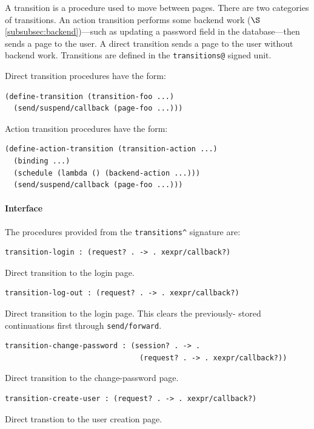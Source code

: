 \documentclass[a4paper]{article}
\begin{document}
A transition is a procedure used to move between pages. There are two categories
of transitions. An action transition performs some backend work
($\S$\ref{subsubsec:backend})---such as updating a password field in the
database---then sends a page to the user. A direct transition sends a page to
the user without backend work. Transitions are defined in the
\verb|transitions@| signed unit.

Direct transition procedures have the form:

\begin{verbatim}
(define-transition (transition-foo ...)
  (send/suspend/callback (page-foo ...)))
\end{verbatim}

Action transition procedures have the form:

\begin{verbatim}
(define-action-transition (transition-action ...)
  (binding ...)
  (schedule (lambda () (backend-action ...)))
  (send/suspend/callback (page-foo ...)))
\end{verbatim}

\paragraph{Interface}\label{para:transitions-interface}

The procedures provided from the \verb|transitions^| signature are:

\begin{verbatim}
transition-login : (request? . -> . xexpr/callback?)
\end{verbatim}
Direct transition to the login page.

\begin{verbatim}
transition-log-out : (request? . -> . xexpr/callback?)
\end{verbatim}
Direct transition to the login page. This clears the previously-
stored continuations first through \verb|send/forward|.

\begin{verbatim}
transition-change-password : (session? . -> .
                               (request? . -> . xexpr/callback?))
\end{verbatim}
Direct transition to the change-password page.

\begin{verbatim}
transition-create-user : (request? . -> . xexpr/callback?)
\end{verbatim}
Direct transtion to the user creation page.
\end{document}
